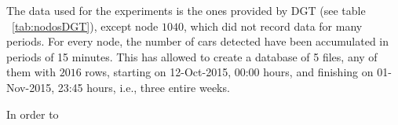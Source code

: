 The data used for the experiments is the ones provided by DGT (see table ~\ref{tab:nodosDGT}), except node $1040$, which did not record data for many periods. For every node, the number of cars detected have been accumulated in periods of 15 minutes. This has allowed to create a database of 5 files, any of them with $2016$ rows, starting on 12-Oct-2015, 00:00 hours, and finishing on 01-Nov-2015, 23:45 hours, i.e., three entire weeks.

In order to







